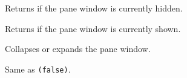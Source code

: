 
Returns \true if the pane window is currently hidden.


\label{wxcollapsiblepaneisexpanded}


Returns \true if the pane window is currently shown.


\label{wxcollapsiblepanecollapse}


Collapses or expands the pane window.


\label{wxcollapsiblepaneexpand}


Same as \texttt{(false)}.


